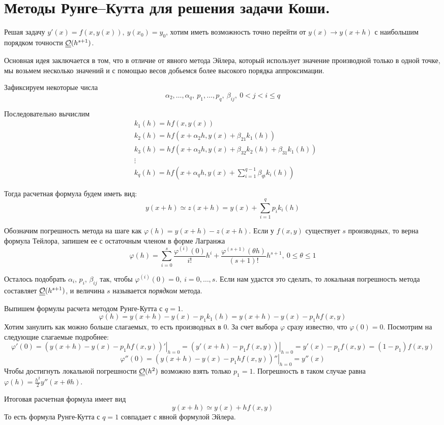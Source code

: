 \section{Методы Рунге–Кутта для решения задачи Коши.}

Решая задачу $y'(x)=f(x,y(x)),\ y(x_0)=y_0$, хотим
иметь возможность точно перейти от $y(x)\rightarrow y(x+h)$
с наибольшим порядком точности $\underline{\underline{\mathcal{O}}}(h^{s+1})$.

Основная идея заключается в том, что в отличие от явного
метода Эйлера, который использует значение производной
только в одной точке, мы возьмем несколько значений
и с помощью весов добьемся более высокого порядка
аппроксимации.

Зафиксируем некоторые числа
\[\alpha_2,\ldots,\alpha_q,\ p_1,\ldots,p_q,\ \beta_{ij},\ 0<j<i\leq q\]

Последовательно вычислим
\begin{align*}
   & k_1(h) = hf(x,y(x))                                             \\
   & k_2(h) = hf(x+\alpha_2h,y(x)+\beta_{21}k_1(h))                  \\
   & k_3(h) = hf(x+\alpha_3h,y(x)+\beta_{32}k_2(h)+\beta_{31}k_1(h)) \\
   & \vdots                                                          \\
   & k_q(h) = hf(x+\alpha_qh,y(x)+\sum_{i=1}^{q-1}\beta_{qi}k_i(h))
\end{align*}

Тогда расчетная формула будем иметь вид:
\[y(x+h)\simeq z(x+h)=y(x)+\sum_{i=1}^{q}p_ik_i(h)\]

Обозначим погрешность метода на шаге как $\varphi(h)=y(x+h)-z(x+h)$.
Если у $f(x,y)$ существует $s$ производных, то верна формула Тейлора,
запишем ее с остаточным членом в форме Лагранжа
\[\varphi(h)=\sum_{i=0}^{s}\frac{\varphi^{(i)}(0)}{i!}h^i+\frac{\varphi^{(s+1)}(\theta h)}{(s+1)!}h^{s+1},\ 0\leq\theta\leq 1\]

Осталось подобрать $\alpha_i$, $p_i$, $\beta_{ij}$ так, чтобы $\varphi^{(i)}(0)=0,\ i=0,\ldots,s$.
Если нам удастся это сделать, то локальная погрешность метода составляет $\underline{\underline{\mathcal{O}}}(h^{s+1})$,
и величина $s$ называется \textit{порядком} метода.

\begin{example}
  Выпишем формулы расчета методом Рунге-Кутта с $q=1$.
  \[\varphi(h)=y(x+h)-y(x)-p_1k_1(h)=y(x+h)-y(x)-p_1hf(x,y)\]
  Хотим занулить как можно больше слагаемых, то есть производных в $0$. За счет выбора $\varphi$
  сразу известно, что $\varphi(0)=0$. Посмотрим на следующие слагаемые подробнее:
  \[\varphi'(0)=\left.(y(x+h)-y(x)-p_1hf(x,y))'\right|_{h=0}=\left.(y'(x+h)-p_1f(x,y))\right|_{h=0}=y'(x)-p_1f(x,y)=(1-p_1)f(x,y)\]
  \[\varphi''(0)=\left.(y(x+h)-y(x)-p_1hf(x,y))''\right|_{h=0}=y''(x)\]
  Чтобы достигнуть локальной погрешности $\underline{\underline{\mathcal{O}}}(h^2)$ возможно
  взять только $p_1=1$. Погрешность в таком случае равна $\varphi(h)=\frac{h^2}{2}y''(x+\theta h)$.

  Итоговая расчетная формула имеет вид
  \[y(x+h)\simeq y(x)+hf(x,y)\]
  То есть формула Рунге-Кутта с $q=1$ совпадает с явной формулой Эйлера.
\end{example}

